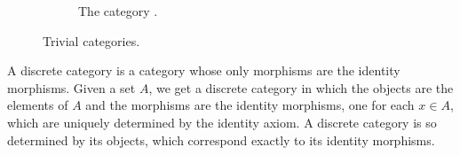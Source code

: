 \begin{example}
\begin{figure}[htb]
\begin{center}
\begin{subfigure}[t]{.3\linewidth}
\begin{center}
        \end{center}
        \caption{The category .}
        \label{fig:category-3}
      \end{subfigure}
    \end{center}
    \caption{Trivial categories.}
    \label{fig:category-trivial}
  \end{figure}

\end{example}

\begin{example}
  \label{ex:category-discrete}


  A discrete category is a category whose only morphisms are the
  identity morphisms. Given a set $A$, we get a discrete category
   in which the objects are the elements of $A$ and the
  morphisms are the identity morphisms, one for each $x \in A$, which
  are uniquely determined by the identity axiom. A discrete category
  is so determined by its objects, which correspond exactly to its
  identity morphisms.

\end{example}

